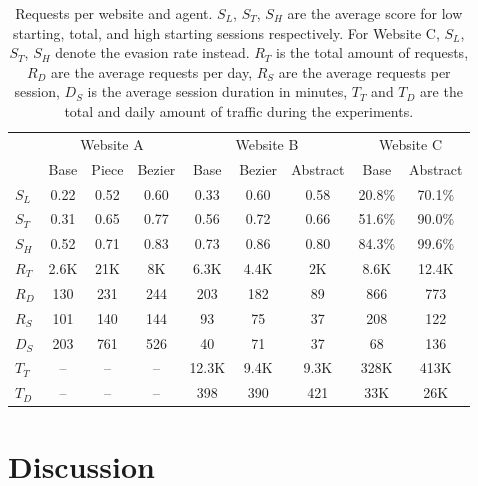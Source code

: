 \begin{table*}
\centering
   \begin{tabular}{lccc|ccc|cc}
    \toprule
    &
      \multicolumn{3}{c}{Website A} &
      \multicolumn{3}{c}{Website B} &
      \multicolumn{2}{c}{Website C}\\
      & \small {Base} & \small {Piece} & \small {Bezier} & \small {Base} & \small {Bezier} & \small {Abstract} & \small {Base} & \small {Abstract}\\
      \toprule
    $S_L$ & 0.22 & 0.52 & 0.60 & 0.33 & 0.60 & 0.58 & 20.8\% & 70.1\%\\
    $S_T$ & 0.31 & 0.65 & 0.77 & 0.56 & 0.72 & 0.66 & 51.6\% & 90.0\% \\
    $S_H$ & 0.52 & 0.71 & 0.83 & 0.73 & 0.86 & 0.80 & 84.3\% & 99.6\% \\
    \midrule
    $R_T$ & 2.6K & 21K & 8K & 6.3K & 4.4K & 2K & 8.6K & 12.4K\\
    $R_D$ & 130 & 231 & 244 & 203 & 182 & 89 & 866 & 773 \\
    $R_S$ & 101 & 140 & 144 & 93 & 75 & 37 & 208 & 122\\
    $D_S$ & 203 & 761 & 526 & 40 & 71 & 37 & 68 & 136\\
    \midrule
    $T_T$ & -- & -- & -- & 12.3K & 9.4K & 9.3K & 328K & 413K \\
    $T_D$ & -- & -- & -- & 398 & 390 & 421 & 33K & 26K\\
    \bottomrule
  \end{tabular}
  \caption{Requests per website and agent. $S_L$, $S_T$, $S_H$ are the average score for low starting, total, and high starting sessions respectively. For Website C, $S_L$, $S_T$, $S_H$ denote the evasion rate instead. $R_T$ is the total amount of requests, $R_D$ are the average requests per day, $R_S$ are the average requests per session, $D_S$ is the average session duration in minutes, $T_T$ and $T_D$ are the total and daily amount of traffic during the experiments.}
  \label{tab:requests}
\end{table*}

\section{Discussion}
\label{sec:discussionre}

